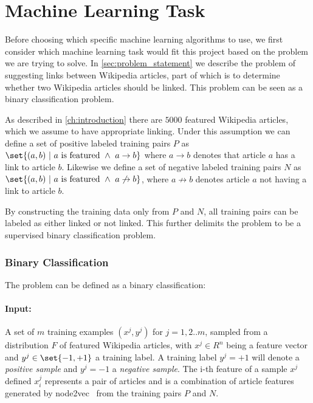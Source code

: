 

\section{Machine Learning Task}\label{sec:machine_learning_task}
Before choosing which specific machine learning algorithms to use, we first consider which machine learning task would fit this project based on the problem we are trying to solve. In \cref{sec:problem_statement} we describe the problem of suggesting links between Wikipedia articles, part of which is to determine whether two Wikipedia articles should be linked. This problem can be seen as a binary classification problem.

As described in \cref{ch:introduction} there are $5000$ featured Wikipedia articles, which we assume to have appropriate linking. Under this assumption we can define a set of positive labeled training pairs $P$ as $\set{(a,b)\ |\ a\text{ is featured}\ \wedge\ a \to b}$ where $a \to b$ denotes that article $a$ has a link to article $b$. Likewise we define a set of negative labeled training pairs $N$ as  $\set{(a,b)\ |\ a\text{ is featured}\ \wedge\ a \not\to b}$, where $a \not\to b$ denotes article $a$ not having a link to article $b$.

By constructing the training data only from $P$ and $N$, all training pairs can be labeled as either linked or not linked. This further delimits the problem to be a supervised binary classification problem.
 
\subsubsection{Binary Classification}

The problem can be defined as a binary classification:

\paragraph{Input:}
A set of $m$ training examples $(x^j,y^j)$ for $j=1,2..m$, sampled from a distribution $F$ of featured Wikipedia articles, with $x^j \in R^n$ being a feature vector and $y^j \in \set{-1,+1}$ a training label. A training label $y^j=+1$ will denote a \textit{positive sample} and $y^j=-1$ a \textit{negative sample}. The i-th feature of a sample $x^j$ defined $x^j_i$ represents a pair of articles and is a combination of article features generated by node2vec~\cite{node2vec} from the training pairs $P$ and $N$.

